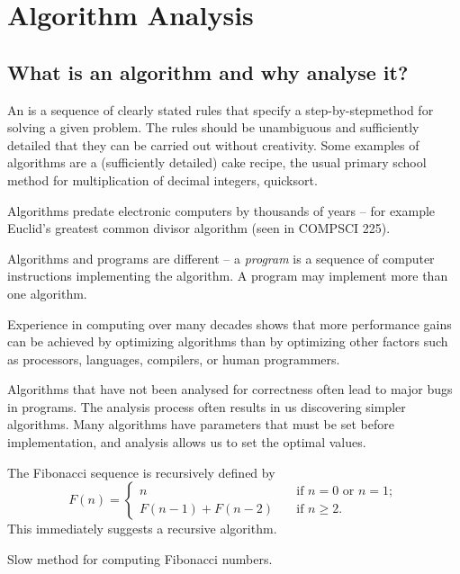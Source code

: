 \part{Algorithm Analysis} \label{ch:alganal}

\chapter{What is an algorithm and why analyse it?} %
An  is a sequence of clearly stated rules that
specify a step-by-step\linebreak[4] method for solving a given problem.
The rules should be unambiguous and sufficiently detailed that they can be carried out without creativity.
Some examples of algorithms are a (sufficiently detailed) cake recipe,
the usual primary school method for multiplication of decimal integers, quicksort.

Algorithms predate electronic computers by thousands of years -- for example
Euclid's greatest common divisor algorithm (seen in COMPSCI 225).

Algorithms and programs are different -- a \emph{program} is a sequence of computer instructions implementing 
the algorithm. A program may implement more than one algorithm.

Experience in computing over many decades shows that more performance gains can be achieved 
by optimizing algorithms than by optimizing other factors such as
processors, languages, compilers, or human programmers.

Algorithms that have not been analysed for correctness often lead to 
major bugs in programs. The analysis process often results in us discovering simpler algorithms.
Many algorithms have parameters that must be set before implementation, and analysis allows us to set the optimal values.


\begin{Boxample}
The Fibonacci sequence is recursively defined by 
$$
F(n) = 
  \left\{\begin{array}{ll}
	n & \quad \text{if } n = 0 \text{ or } n = 1; \\ 
    F(n - 1) + F(n - 2) & \quad \text{if } n \geq 2 \text{.}
  \end{array}
  \right.
$$
This immediately suggests a recursive algorithm.
\end{Boxample}

\begin{algorithm}[H]
  \caption{Slow method for computing Fibonacci numbers.} 
  \label{alg:slowfib}
\begin{algorithmic}[1]
	\EndIf
\EndFunction
\end{algorithmic}
\end{algorithm}

